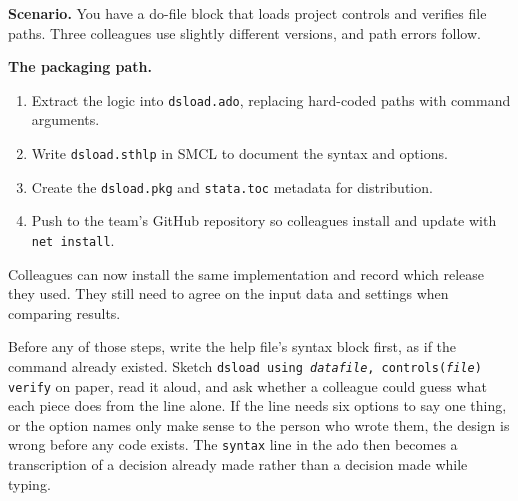 \begin{appliedexample}\label{ae:ch15-sharedtool}
\textbf{Scenario.} You have a do-file block that loads project controls and verifies file paths. Three colleagues use slightly different versions, and path errors follow.

\medskip
\textbf{The packaging path.}
\begin{enumerate}
    \item Extract the logic into \texttt{dsload.ado}, replacing hard-coded paths with command arguments.
    \item Write \texttt{dsload.sthlp} in SMCL to document the syntax and options.
    \item Create the \texttt{dsload.pkg} and \texttt{stata.toc} metadata for distribution.
    \item Push to the team's GitHub repository so colleagues install and update with \texttt{net install}.
\end{enumerate}
Colleagues can now install the same implementation and record which release they used. They still need to agree on the input data and settings when comparing results.
\end{appliedexample}

Before any of those steps, write the help file's syntax block first, as if the command already existed. Sketch \texttt{dsload using \textit{datafile}, controls(\textit{file}) verify} on paper, read it aloud, and ask whether a colleague could guess what each piece does from the line alone. If the line needs six options to say one thing, or the option names only make sense to the person who wrote them, the design is wrong before any code exists. The \texttt{syntax} line in the ado then becomes a transcription of a decision already made rather than a decision made while typing.

